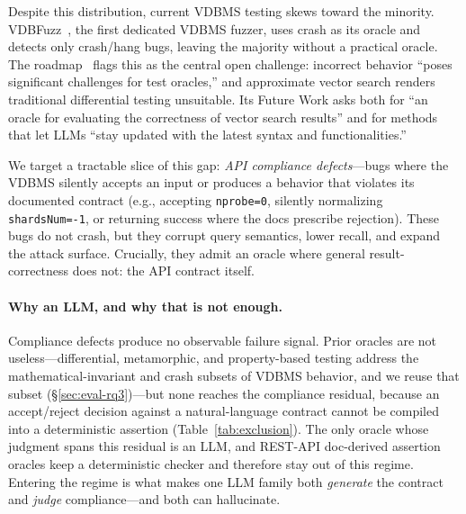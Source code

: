 \documentclass[sigconf]{acmart}
\begin{document}
Despite this distribution, current VDBMS testing skews toward the minority. VDBFuzz~\cite{vdbfuzz26}, the first dedicated VDBMS fuzzer, uses crash as its oracle and detects only crash/hang bugs, leaving the majority without a practical oracle. The roadmap~\cite{roadmap25} flags this as the central open challenge: incorrect behavior ``poses significant challenges for test oracles,'' and approximate vector search renders traditional differential testing unsuitable. Its Future Work asks both for ``an oracle for evaluating the correctness of vector search results'' and for methods that let LLMs ``stay updated with the latest syntax and functionalities.''

We target a tractable slice of this gap: \emph{API compliance defects}---bugs where the VDBMS silently accepts an input or produces a behavior that violates its documented contract (e.g., accepting \texttt{nprobe=0}, silently normalizing \texttt{shardsNum=-1}, or returning success where the docs prescribe rejection). These bugs do not crash, but they corrupt query semantics, lower recall, and expand the attack surface. Crucially, they admit an oracle where general result-correctness does not: the API contract itself.

\paragraph{Why an LLM, and why that is not enough.}
Compliance defects produce no observable failure signal. Prior oracles are not useless---differential, metamorphic, and property-based testing address the mathematical-invariant and crash subsets of VDBMS behavior, and we reuse that subset (\S\ref{sec:eval-rq3})---but none reaches the compliance residual, because an accept/reject decision against a natural-language contract cannot be compiled into a deterministic assertion (Table~\ref{tab:exclusion}). The only oracle whose judgment spans this residual is an LLM, and REST-API doc-derived assertion oracles keep a deterministic checker and therefore stay out of this regime. Entering the regime is what makes one LLM family both \emph{generate} the contract and \emph{judge} compliance---and both can hallucinate.
\end{document}
